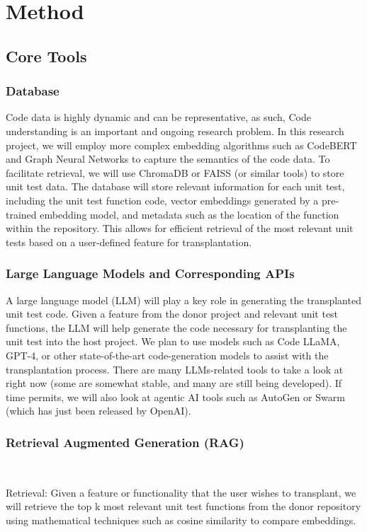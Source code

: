 \documentclass[sigconf]{acmart}
\begin{document}
\section{Method}
\subsection{Core Tools}
\subsubsection{Database}
Code data is highly dynamic and can be representative, as such, Code understanding is an important and ongoing research problem. In this research project, we will employ more complex embedding algorithms such as CodeBERT and Graph Neural Networks to capture the semantics of the code data. To facilitate retrieval, we will use ChromaDB or FAISS (or similar tools) to store unit test data. The database will store relevant information for each unit test, including the unit test function code, vector embeddings generated by a pre-trained embedding model, and metadata such as the location of the function within the repository. This allows for efficient retrieval of the most relevant unit tests based on a user-defined feature for transplantation.

\subsubsection{Large Language Models and Corresponding APIs}
A large language model (LLM) will play a key role in generating the transplanted unit test code. Given a feature from the donor project and relevant unit test functions, the LLM will help generate the code necessary for transplanting the unit test into the host project. We plan to use models such as Code LLaMA, GPT-4, or other state-of-the-art code-generation models to assist with the transplantation process. There are many LLMs-related tools to take a look at right now (some are somewhat stable, and many are still being developed). If time permits, we will also look at agentic AI tools such as AutoGen or Swarm (which has just been released by OpenAI).

\subsubsection{Retrieval Augmented Generation (RAG)}
\

Retrieval: Given a feature or functionality that the user wishes to transplant, we will retrieve the top k most relevant unit test functions from the donor repository using mathematical techniques such as cosine similarity to compare embeddings.
\end{document}
